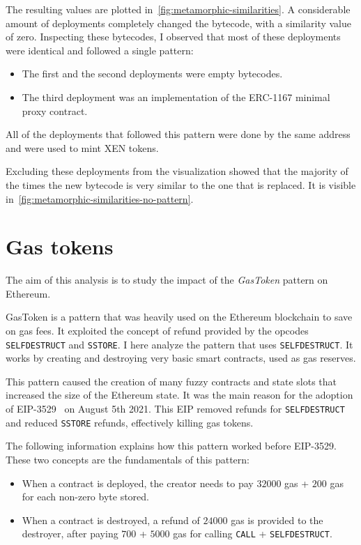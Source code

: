 The resulting values are plotted in~\cref{fig:metamorphic-similarities}. A considerable amount of deployments completely changed the bytecode, with a similarity value of zero. Inspecting these bytecodes, I observed that most of these deployments were identical and followed a single pattern: 

\begin{itemize}
    \item The first and the second deployments were empty bytecodes.
    \item The third deployment was an implementation of the ERC-1167 minimal proxy contract.
\end{itemize}

All of the deployments that followed this pattern were done by the same address and were used to mint XEN tokens.

Excluding these deployments from the visualization showed that the majority of the times the new bytecode is very similar to the one that is replaced. It is visible in~\cref{fig:metamorphic-similarities-no-pattern}.


\newpage

\section{Gas tokens}
\label{gas-tokens}

The aim of this analysis is to study the impact of the \textit{GasToken} pattern on Ethereum.

GasToken is a pattern that was heavily used on the Ethereum blockchain to save on gas fees. It exploited the concept of refund provided by the opcodes {\tt SELFDESTRUCT} and {\tt SSTORE}. 
I here analyze the pattern that uses {\tt SELFDESTRUCT}. It works by creating and destroying very basic smart contracts, used as gas reserves. 

This pattern caused the creation of many fuzzy contracts and state slots that increased the size of the Ethereum state. It was the main reason for the adoption of EIP-3529~\cite{eip-3529} on August 5th 2021. This EIP removed refunds for {\tt SELFDESTRUCT} and reduced {\tt SSTORE} refunds, effectively killing gas tokens. 

The following information explains how this pattern worked before EIP-3529. These two concepts are the fundamentals of this pattern: 

\begin{itemize}
    \item When a contract is deployed, the creator needs to pay $32000$ gas + $200$ gas for each non-zero byte stored.

    \item When a contract is destroyed, a refund of $24000$ gas is provided to the destroyer, after paying $700$ + $5000$ gas for calling {\tt CALL} + {\tt SELFDESTRUCT}. 
\end{itemize}

